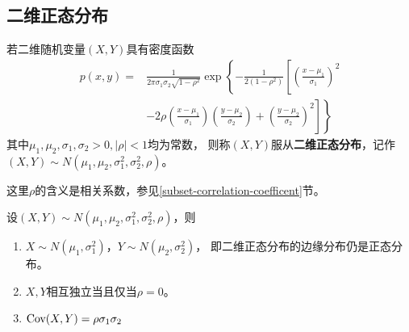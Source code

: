 \subsection{二维正态分布}
\begin{definition}[二维正态分布]
  若二维随机变量$(X,Y)$具有密度函数
  \begin{align*}
    p(x,y)=&\frac{1}{2\pi\sigma_1\sigma_2\sqrt{1-\rho^2}}
      \exp\left\{-\frac{1}{2(1-\rho^2)}\left[
        \left(\frac{x-\mu_1}{\sigma_1}\right)^2\right.\right.\\
        &\left.\left.-2\rho\left(\frac{x-\mu_1}{\sigma_1}\right)
          \left(\frac{y-\mu_2}{\sigma_2}\right)
        +\left(\frac{y-\mu_2}{\sigma_2}\right)^2\right]\right\}
  \end{align*}
  其中$\mu_1,\mu_2,\sigma_1,\sigma_2 > 0, |\rho| < 1$均为常数，
  则称$(X,Y)$服从\textbf{二维正态分布}，记作
  $(X,Y)\sim N(\mu_1,\mu_2,\sigma_1^2,\sigma_2^2,\rho)$。
\end{definition}

\begin{remark}
  这里$\rho$的含义是相关系数，参见\ref{subset-correlation-coefficent}节。
\end{remark}

\begin{theorem}[二维正态分布的性质]
  设$(X,Y)\sim N(\mu_1,\mu_2,\sigma_1^2,\sigma_2^2,\rho)$，则
  \begin{enumerate}
    \item
    $X\sim N(\mu_1,\sigma_1^2)$，$Y\sim N(\mu_2,\sigma_2^2)$，
    即二维正态分布的边缘分布仍是正态分布。
    \item
    $X,Y$相互独立当且仅当$\rho = 0$。
    \item
    $\textrm{Cov}(X,Y) = \rho\sigma_1\sigma_2$
  \end{enumerate}
\end{theorem}
